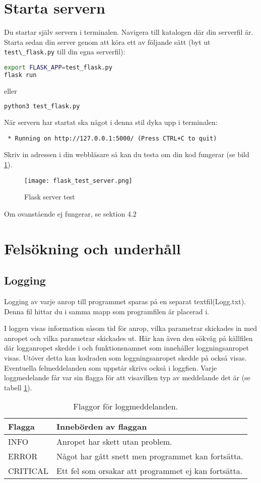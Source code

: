 \documentclass{TDP003mall}
\begin{document}
\section{Starta servern}
Du startar själv servern i terminalen. Navigera till katalogen där din serverfil är. Starta sedan din server genom att köra ett av följande sätt (byt ut \verb|test\_flask.py| till din egna serverfil):

\begin{lstlisting}[language=bash]
export FLASK_APP=test_flask.py
flask run
\end{lstlisting}
eller
\begin{lstlisting}[language=bash]
python3 test_flask.py
\end{lstlisting}
När servern har startat ska något i denna stil dyka upp i terminalen:
\begin{verbatim}
 * Running on http://127.0.0.1:5000/ (Press CTRL+C to quit)
\end{verbatim}
Skriv in adressen i din webbläsare så kan du testa om din kod fungerar (se bild \ref{fig:flask_server}).
\begin{figure}[!h]
    \centering
    \texttt{[image: flask\_test\_server.png]}
    \caption{Flask server test}
    \label{fig:flask_server}
\end{figure}
Om ovanstående ej fungerar, se sektion 4.2


\newpage
\section{Felsökning och underhåll}
\subsection{Logging}
Logging av varje anrop till programmet sparas på en separat textfil(Logg.txt). Denna fil hittar du i samma mapp som programfilen är placerad i.

I loggen visas information såsom tid för anrop, vilka parametrar skickades in med anropet och vilka parametrar skickades ut. Här kan även den sökväg på källfilen där logganropet skedde i och funktionsnamnet som innehåller loggningsanropet visas. Utöver detta kan kodraden som loggningsanropet skedde på också visas. Eventuella felmeddelanden som uppstår skrivs också i loggfien. Varje loggmedelande får var sin flagga för att visavilken typ av meddelande det är (se tabell \ref{fig:logging_flags}).

\begin{table}[!h]
\caption{Flaggor för loggmeddelanden.}
\label{fig:logging_flags}
\begin{tabularx}{\linewidth}{|l|X|}
\hline
Flagga & Innebörden av flaggan 
\\ \hline
INFO & Anropet har skett utan problem. 
\\ \hline
ERROR & Något har gått snett men programmet kan fortsätta. 
\\ \hline
CRITICAL & Ett fel som orsakar att programmet ej kan fortsätta. 
\\ \hline
\end{tabularx}
\end{table}
\end{document}
